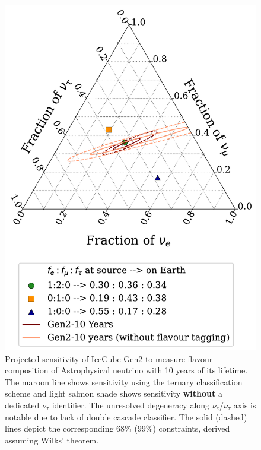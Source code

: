 \begin{figure}[h!]
    
    \caption{Projected sensitivity of IceCube-Gen2 to measure flavour composition of Astrophysical neutrino with 10 years of its lifetime. The maroon line shows sensitivity using the ternary classification scheme and light salmon shade shows sensitivity \textbf{without} a dedicated $\nu_{\tau}$ identifier. The unresolved degeneracy along $\nu_e$/$\nu_{\tau}$ axis is notable due to lack of double cascade classifier. The solid (dashed) lines depict the corresponding 68\% (99\%) constraints, derived assuming Wilks' theorem.}
    \includegraphics{./figures/gen2/Gen2-10Years.pdf}
    
\end{figure}

